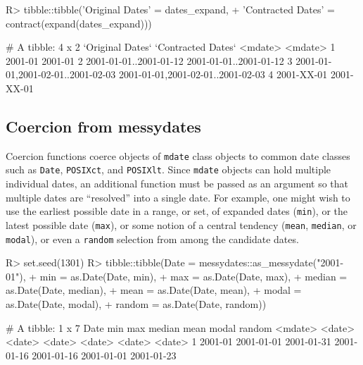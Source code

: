 \documentclass[
]{jss}
\begin{document}
\begin{CodeChunk}
\begin{CodeInput}
R> tibble::tibble('Original Dates' = dates_expand,
+                'Contracted Dates' = contract(expand(dates_expand)))
\end{CodeInput}
\begin{CodeOutput}
# A tibble: 4 x 2
  `Original Dates`                    `Contracted Dates`                 
  <mdate>                             <mdate>                            
1 2001-01                             2001-01                            
2 2001-01-01..2001-01-12              2001-01-01..2001-01-12             
3 {2001-01-01,2001-02-01..2001-02-03} {2001-01-01,2001-02-01..2001-02-03}
4 2001-XX-01                          2001-XX-01                         
\end{CodeOutput}
\end{CodeChunk}

\hypertarget{coercion-from-messydates}{%
\subsection{Coercion from messydates}\label{coercion-from-messydates}}

Coercion functions coerce objects of \texttt{mdate} class objects to
common date classes such as \texttt{Date}, \texttt{POSIXct}, and
\texttt{POSIXlt}. Since \texttt{mdate} objects can hold multiple
individual dates, an additional function must be passed as an argument
so that multiple dates are ``resolved'' into a single date. For example,
one might wish to use the earliest possible date in a range, or set, of
expanded dates (\texttt{min}), or the latest possible date
(\texttt{max}), or some notion of a central tendency (\texttt{mean},
\texttt{median}, or \texttt{modal}), or even a \texttt{random} selection
from among the candidate dates.

\begin{CodeChunk}
\begin{CodeInput}
R> set.seed(1301)
R> tibble::tibble(Date = messydates::as_messydate("2001-01"),
+                min = as.Date(Date, min),
+                max = as.Date(Date, max),
+                median = as.Date(Date, median),
+                mean = as.Date(Date, mean),
+                modal = as.Date(Date, modal),
+                random = as.Date(Date, random))
\end{CodeInput}
\begin{CodeOutput}
# A tibble: 1 x 7
  Date    min        max        median     mean       modal      random    
  <mdate> <date>     <date>     <date>     <date>     <date>     <date>    
1 2001-01 2001-01-01 2001-01-31 2001-01-16 2001-01-16 2001-01-01 2001-01-23
\end{CodeOutput}
\end{CodeChunk}
\end{document}
